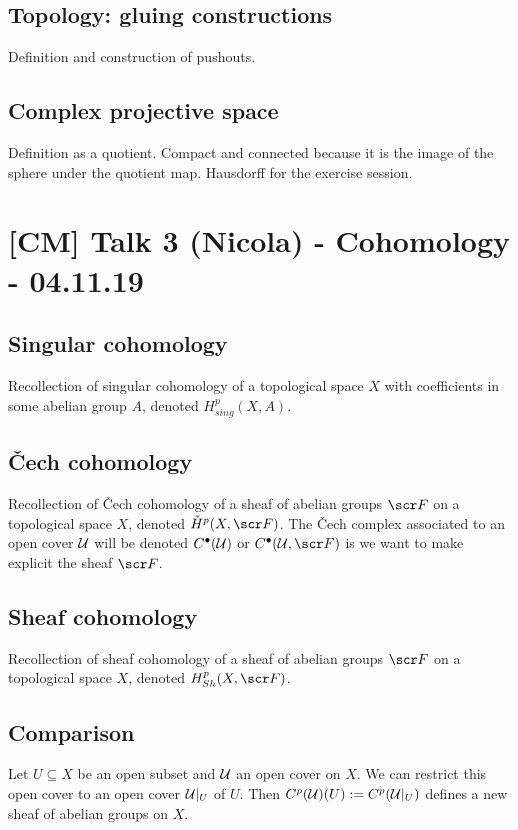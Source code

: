 \documentclass[A4paper, british, reqno]{amsart}
\theoremstyle{darkgreentheorem}
\theoremstyle{darkbluedefinition}
\theoremstyle{darkredexample}
\theoremstyle{remark}
\newcommand{\1}{\mathbbm{1}}
\newcommand{\grd}{^{\bullet}}
\begin{document}
\subsection{Topology: gluing constructions}

Definition and construction of pushouts.

\subsection{Complex projective space}

Definition as a quotient.
Compact and connected because it is the image of the sphere under the quotient map.
Hausdorff for the exercise session.

\section{[CM] Talk 3 (Nicola) - Cohomology - 04.11.19}

\subsection{Singular cohomology}

Recollection of singular cohomology of a topological space $X$ with coefficients in some abelian group $A$, denoted $H^{p}_{sing}(X,A)$.

\subsection{\v{C}ech cohomology}

Recollection of \v{C}ech cohomology of a sheaf of abelian groups $\F$ on a topological space $X$, denoted $\check{H}^{p}(X,\F)$.
The \v{C}ech complex associated to an open cover $\mathcal{U}$ will be denoted $C\grd(\U)$ or $C\grd(\U,\F)$ is we want to make explicit the sheaf $\F$.

\subsection{Sheaf cohomology}

Recollection of sheaf cohomology of a sheaf of abelian groups $\F$ on a topological space $X$, denoted $H^{p}_{Sh}(X,\F)$.

\subsection{Comparison}

Let $U\subseteq X$ be an open subset and $\mathcal{U}$ an open cover on $X$.
We can restrict this open cover to an open cover $\mathcal{U}|_{U}$ of $U$.
Then $C^{p}(\mathcal{U})(U):=C^{p}(\mathcal{U}|_{U})$ defines a new sheaf of abelian groups on $X$.
\end{document}
